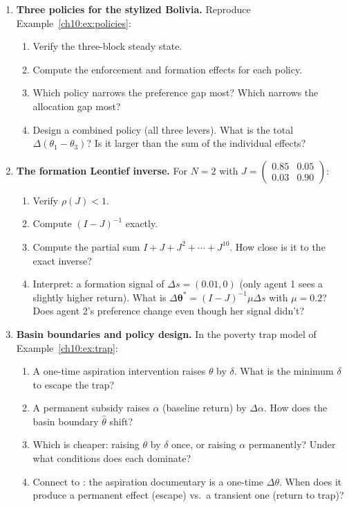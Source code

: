 \documentclass[../structural_economics_book.tex]{subfiles}
\begin{document}
\begin{enumerate}[label=\textbf{10.\arabic*}, leftmargin=3em]
\item \textbf{Three policies for the stylized Bolivia.} Reproduce Example~\ref{ch10:ex:policies}:
\begin{enumerate}
\item Verify the three-block steady state.
\item Compute the enforcement and formation effects for each policy.
\item Which policy narrows the preference gap most? Which narrows the allocation gap most?
\item Design a combined policy (all three levers). What is the total $\Delta(\theta_1 - \theta_3)$? Is it larger than the sum of the individual effects?
\end{enumerate}

\item \textbf{The formation Leontief inverse.} For $N = 2$ with $J = \begin{pmatrix} 0.85 & 0.05 \\ 0.03 & 0.90 \end{pmatrix}$:
\begin{enumerate}
\item Verify $\rho(J) < 1$.
\item Compute $(I - J)^{-1}$ exactly.
\item Compute the partial sum $I + J + J^2 + \cdots + J^{10}$. How close is it to the exact inverse?
\item Interpret: a formation signal of $\Delta s = (0.01, 0)$ (only agent 1 sees a slightly higher return). What is $\Delta\boldsymbol{\theta}^* = (I - J)^{-1}\mu\Delta s$ with $\mu = 0.2$? Does agent 2's preference change even though her signal didn't?
\end{enumerate}

\item \textbf{Basin boundaries and policy design.} In the poverty trap model of Example~\ref{ch10:ex:trap}:
\begin{enumerate}
\item A one-time aspiration intervention raises $\theta$ by $\delta$. What is the minimum $\delta$ to escape the trap?
\item A permanent subsidy raises $\alpha$ (baseline return) by $\Delta\alpha$. How does the basin boundary $\hat{\theta}$ shift?
\item Which is cheaper: raising $\theta$ by $\delta$ once, or raising $\alpha$ permanently? Under what conditions does each dominate?
\item Connect to \citet{bernard2014future}: the aspiration documentary is a one-time $\Delta\theta$. When does it produce a permanent effect (escape) vs.\ a transient one (return to trap)?
\end{enumerate}


\end{enumerate}
\end{document}
